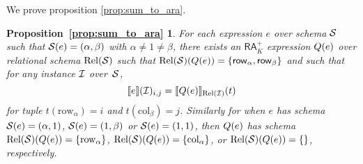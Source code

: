\newtheorem*{SUMTOARA}{Proposition~\ref{prop:sum_to_ara}}

We prove proposition \ref{prop:sum_to_ara}.

\begin{SUMTOARA}
  For each \langsum expression $e$ over schema $\mathcal{S}$ such that $\mathcal{S}(e)=(\alpha,\beta)$ with $\alpha\neq 1\neq\beta$, there exists an $\mathsf{RA}_{K}^+$  expression $Q(e)$ over relational schema $\text{Rel}(\mathcal{S})$ such that $\text{Rel}(\mathcal{S})(Q(e))=\{\mathsf{row}_\alpha,\mathsf{row}_\beta\}$ and 
	such that for any instance $\mathcal{I}$ over~$\mathcal{S}$,
	$$
	\llbracket e \rrbracket(\mathcal{I})_{i,j}=\llbracket Q(e) \rrbracket_{\text{Rel}(\mathcal{I})}(t)
	$$
	for tuple $t(\mathrm{row}_\alpha)=i$ and $t(\mathrm{col}_\beta)=j$. Similarly for when $e$ has schema $\mathcal{S}(e)=(\alpha,1)$, $\mathcal{S}(e)=(1,\beta)$ or $\mathcal{S}(e)=(1,1)$, then $Q(e)$ has schema $\text{Rel}(\mathcal{S})(Q(e))=\{\mathrm{row}_\alpha\}$,
	$\text{Rel}(\mathcal{S})(Q(e))=\{\mathrm{col}_\alpha\}$, or
	$\text{Rel}(\mathcal{S})(Q(e))=\{\}$, respectively.
\end{SUMTOARA}

